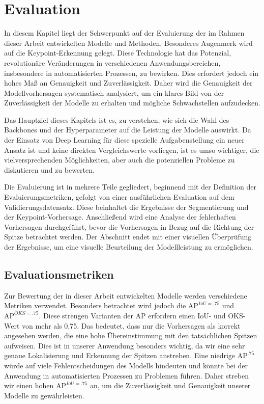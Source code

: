 \chapter{Evaluation}
In diesem Kapitel liegt der Schwerpunkt auf der Evaluierung der im Rahmen dieser Arbeit entwickelten Modelle und Methoden.
Besonderes Augenmerk wird auf die Keypoint-Erkennung gelegt. Diese Technologie hat das Potenzial, revolutionäre Veränderungen in verschiedenen Anwendungsbereichen, insbesondere in automatisierten Prozessen, zu bewirken. Dies erfordert jedoch ein hohes Maß an Genauigkeit und Zuverlässigkeit. Daher wird die Genauigkeit der Modellvorhersagen systematisch analysiert, um ein klares Bild von der Zuverlässigkeit der Modelle zu erhalten und mögliche Schwachstellen aufzudecken.

Das Hauptziel dieses Kapitels ist es, zu verstehen, wie sich die Wahl des Backbones und der Hyperparameter auf die Leistung der Modelle auswirkt.
Da der Einsatz von Deep Learning für diese spezielle Aufgabenstellung ein neuer Ansatz ist und keine direkten Vergleichswerte vorliegen, ist es umso wichtiger, die vielversprechenden Möglichkeiten, aber auch die potenziellen Probleme zu diskutieren und zu bewerten.

Die Evaluierung ist in mehrere Teile gegliedert, beginnend mit der Definition der Evaluierungsmetriken, gefolgt von einer ausführlichen Evaluation auf dem Validierungsdatensatz. Diese beinhaltet die Ergebnisse der Segmentierung und der Keypoint-Vorhersage. Anschließend wird eine Analyse der fehlerhaften Vorhersagen durchgeführt, bevor die Vorhersagen in Bezug auf die Richtung der Spitze betrachtet werden. Der Abschnitt endet mit einer visuellen Überprüfung der Ergebnisse, um eine visuelle Beurteilung der Modellleistung zu ermöglichen.
\section{Evaluationsmetriken}
Zur Bewertung der in dieser Arbeit entwickelten Modelle werden verschiedene Metriken verwendet. Besonders betrachtet wird jedoch die $\text{AP}^{IoU=.75}$ und $\text{AP}^{OKS=.75}$. Diese strengen Varianten der AP erfordern einen IoU- und OKS-Wert von mehr als 0,75. Das bedeutet, dass nur die Vorhersagen als korrekt angesehen werden, die eine hohe Übereinstimmung mit den tatsächlichen Spitzen aufweisen.
Dies ist in unserer Anwendung besonders wichtig, da wir eine sehr genaue Lokalisierung und Erkennung der Spitzen anstreben. Eine niedrige $\text{AP}^{.75}$ würde auf viele Fehlentscheidungen des Modells hindeuten und könnte bei der Anwendung in automatisierten Prozessen zu Problemen führen. Daher streben wir einen hohen $\text{AP}^{IoU=.75}$ an, um die Zuverlässigkeit und Genauigkeit unserer Modelle zu gewährleisten.

